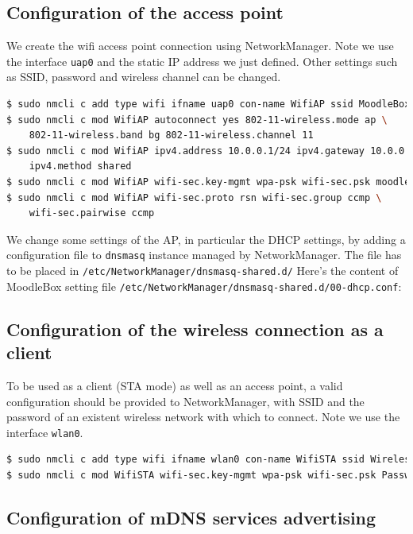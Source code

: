 \documentclass[12pt]{article}
\begin{document}
\subsection{Configuration of the access point}

We create the wifi access point connection using NetworkManager.
Note we use the interface \lstinline{uap0} and the static IP address we just defined.
Other settings such as SSID, password and wireless channel can be changed.
\begin{lstlisting}[language=bash]
$ sudo nmcli c add type wifi ifname uap0 con-name WifiAP ssid MoodleBox
$ sudo nmcli c mod WifiAP autoconnect yes 802-11-wireless.mode ap \
    802-11-wireless.band bg 802-11-wireless.channel 11
$ sudo nmcli c mod WifiAP ipv4.address 10.0.0.1/24 ipv4.gateway 10.0.0.1 \
    ipv4.method shared
$ sudo nmcli c mod WifiAP wifi-sec.key-mgmt wpa-psk wifi-sec.psk moodlebox
$ sudo nmcli c mod WifiAP wifi-sec.proto rsn wifi-sec.group ccmp \
    wifi-sec.pairwise ccmp
\end{lstlisting}

We change some settings of the AP, in particular the DHCP settings, by adding a configuration file to \lstinline{dnsmasq} instance managed by NetworkManager.
The file has to be placed in \lstinline{/etc/NetworkManager/dnsmasq-shared.d/}
Here's the content of MoodleBox setting file \lstinline{/etc/NetworkManager/dnsmasq-shared.d/00-dhcp.conf}:


\subsection{Configuration of the wireless connection as a client}

To be used as a client (STA mode) as well as an access point, a valid configuration should be provided to NetworkManager, with SSID and the password of an existent wireless network with which to connect.
Note we use the interface \lstinline{wlan0}.
\begin{lstlisting}[language=bash]
$ sudo nmcli c add type wifi ifname wlan0 con-name WifiSTA ssid WirelessLAN
$ sudo nmcli c mod WifiSTA wifi-sec.key-mgmt wpa-psk wifi-sec.psk Password
\end{lstlisting}

\subsection{Configuration of mDNS services advertising}
\end{document}
